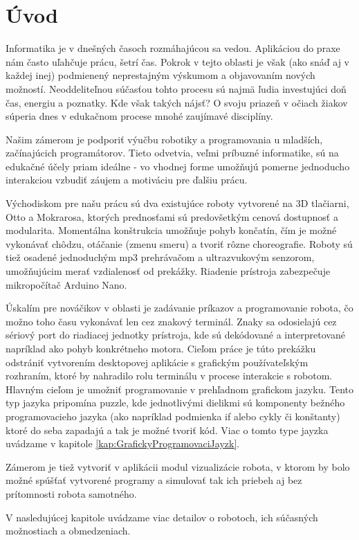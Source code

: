 
\chapter*{Úvod} %

Informatika je v dnešných časoch rozmáhajúcou sa vedou. Aplikáciou do praxe nám často uľahčuje prácu, šetrí čas. Pokrok v tejto oblasti je však (ako snáď aj v každej inej) podmienený neprestajným výskumom a objavovaním nových možností. Neoddeliteľnou súčasťou tohto procesu sú najmä ľudia investujúci doň čas, energiu a poznatky. Kde však takých nájsť? O svoju priazeň v očiach žiakov súperia dnes v edukačnom procese mnohé zaujímavé disciplíny.

Našim zámerom je podporiť výučbu robotiky a programovania u mladších, začínajúcich programátorov. Tieto odvetvia, veľmi príbuzné informatike, sú na edukačné  účely priam ideálne - vo vhodnej forme umožňujú pomerne jednoducho interakciou vzbudiť záujem a motiváciu pre ďalšiu prácu.

Východiskom pre našu prácu sú dva existujúce roboty vytvorené na 3D tlačiarni, Otto a Mokrarosa, ktorých prednosťami sú predovšetkým cenová dostupnosť a modularita. Momentálna konštrukcia umožňuje pohyb končatín, čím je možné vykonávať chôdzu, otáčanie (zmenu smeru) a tvoriť rôzne choreografie. Roboty sú tiež osadené jednoduchým mp3 prehrávačom a ultrazvukovým senzorom, umožňujúcim merať vzdialenosť od prekážky. Riadenie prístroja zabezpečuje mikropočítač Arduino Nano.

Úskalím pre nováčikov v oblasti je zadávanie príkazov a programovanie robota, čo možno toho času vykonávať len cez znakový terminál. Znaky sa odosielajú cez sériový port do riadiacej jednotky prístroja, kde sú dekódované a interpretované napríklad ako pohyb konkrétneho motora. Cieľom práce je túto prekážku odstrániť vytvorením desktopovej aplikácie s grafickým používateľským rozhraním, ktoré by nahradilo rolu terminálu v procese interakcie s robotom. Hlavným cieľom je umožniť programovanie v prehľadnom grafickom jazyku. Tento typ jazyka pripomína puzzle, kde jednotlivými dielikmi sú komponenty bežného programovacieho jazyka (ako napríklad podmienka if alebo cykly či konštanty) ktoré do seba zapadajú a tak je možné tvoriť kód. Viac o tomto type jayzka uvádzame v kapitole \ref{kap:GrafickyProgramovaciJayzk}.

Zámerom je tiež vytvoriť v aplikácii modul vizualizácie robota, v ktorom by bolo možné spúšťať vytvorené programy a simulovať tak ich priebeh aj bez prítomnosti robota samotného.

V nasledujúcej kapitole uvádzame viac detailov o robotoch, ich súčasných možnostiach a obmedzeniach.
